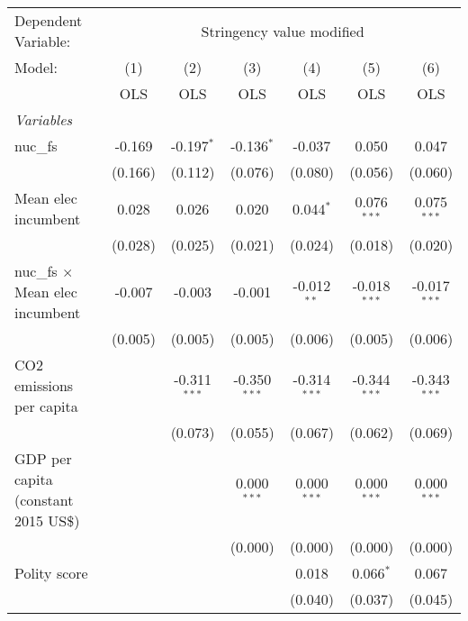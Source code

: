 
\begingroup
\centering
\begin{tabular}{lcccccc}
   \toprule
   Dependent Variable: & \multicolumn{6}{c}{Stringency value modified}\\
   Model:                                 & (1)     & (2)            & (3)            & (4)            & (5)            & (6)\\  
                                          &  OLS    & OLS            & OLS            & OLS            & OLS            & OLS\\  
   \midrule
   \emph{Variables}\\
   nuc\_fs                                & -0.169  & -0.197$^{*}$   & -0.136$^{*}$   & -0.037         & 0.050          & 0.047\\   
                                          & (0.166) & (0.112)        & (0.076)        & (0.080)        & (0.056)        & (0.060)\\   
   Mean elec incumbent                    & 0.028   & 0.026          & 0.020          & 0.044$^{*}$    & 0.076$^{***}$  & 0.075$^{***}$\\   
                                          & (0.028) & (0.025)        & (0.021)        & (0.024)        & (0.018)        & (0.020)\\   
   nuc\_fs $\times$ Mean elec incumbent   & -0.007  & -0.003         & -0.001         & -0.012$^{**}$  & -0.018$^{***}$ & -0.017$^{***}$\\   
                                          & (0.005) & (0.005)        & (0.005)        & (0.006)        & (0.005)        & (0.006)\\   
   CO2 emissions per capita               &         & -0.311$^{***}$ & -0.350$^{***}$ & -0.314$^{***}$ & -0.344$^{***}$ & -0.343$^{***}$\\   
                                          &         & (0.073)        & (0.055)        & (0.067)        & (0.062)        & (0.069)\\   
   GDP per capita (constant 2015 US\$)    &         &                & 0.000$^{***}$  & 0.000$^{***}$  & 0.000$^{***}$  & 0.000$^{***}$\\   
                                          &         &                & (0.000)        & (0.000)        & (0.000)        & (0.000)\\   
   Polity score                           &         &                &                & 0.018          & 0.066$^{*}$    & 0.067\\   
                                          &         &                &                & (0.040)        & (0.037)        & (0.045)\\   

\end{tabular}
